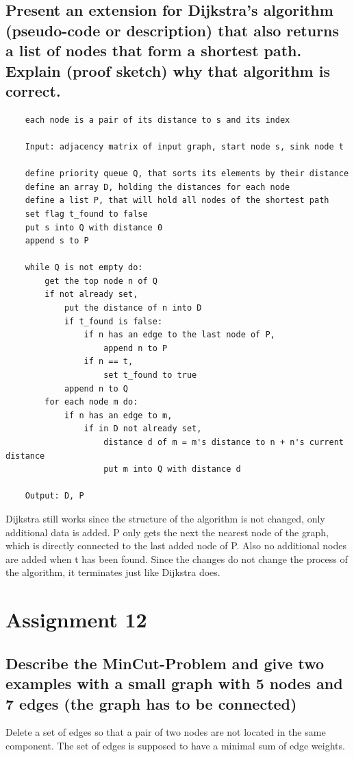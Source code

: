 \documentclass[runningheads]{llncs}
\begin{document}
\subsection*{Present an extension for Dijkstra's algorithm (pseudo-code or description) that also returns a list of nodes that form a shortest path. Explain (proof sketch) why that algorithm is correct.}
\begin{verbatim}
    each node is a pair of its distance to s and its index 

    Input: adjacency matrix of input graph, start node s, sink node t

    define priority queue Q, that sorts its elements by their distance
    define an array D, holding the distances for each node
    define a list P, that will hold all nodes of the shortest path
    set flag t_found to false
    put s into Q with distance 0
    append s to P

    while Q is not empty do:
        get the top node n of Q
        if not already set,
            put the distance of n into D
            if t_found is false: 
                if n has an edge to the last node of P,
                    append n to P
                if n == t, 
                    set t_found to true
            append n to Q
        for each node m do:
            if n has an edge to m,
                if in D not already set,
                    distance d of m = m's distance to n + n's current distance
                    put m into Q with distance d
                    
    Output: D, P
\end{verbatim}

Dijkstra still works since the structure of the algorithm is not changed, only additional data is added. P only
gets the next the nearest node of the graph, which is directly connected to the last added node of P. Also no additional
nodes are added when t has been found. Since the changes do not change the process of the algorithm, it terminates just
like Dijkstra does.

\section*{Assignment 12}
\subsection*{Describe the MinCut-Problem and give two examples with a small graph with
    5 nodes and 7 edges (the graph has to be connected)}

Delete a set of edges so that a pair of two nodes are not located in the same component. The set of edges is supposed to have a minimal sum of
edge weights.


\begin{thebibliography}{8}

\end{thebibliography}
\end{document}
